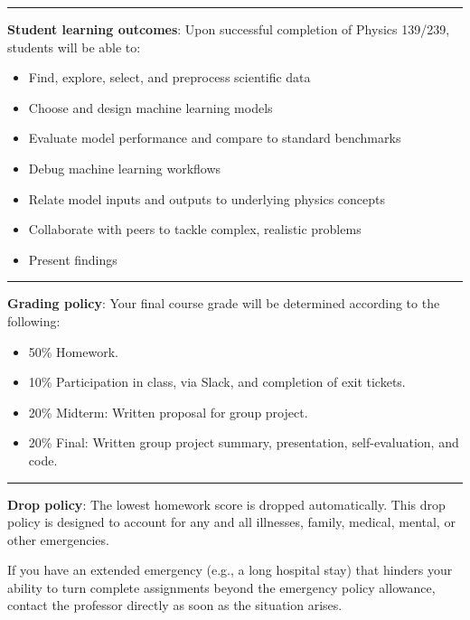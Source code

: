 \documentclass[12pt]{article}
\begin{document}
\begin{center}
	\rule{\textwidth}{0.5pt}
\end{center}

\noindent\textbf{Student learning outcomes}: Upon successful completion of Physics 139/239, students will be able to:
\begin{itemize}
	\item Find, explore, select, and preprocess scientific data
	\item Choose and design machine learning models
	\item Evaluate model performance and compare to standard benchmarks
	\item Debug machine learning workflows
	\item Relate model inputs and outputs to underlying physics concepts
	\item Collaborate with peers to tackle complex, realistic problems
	\item Present findings
\end{itemize}

\begin{center}
	\rule{\textwidth}{0.5pt}
\end{center}

\noindent\textbf{Grading policy}: Your final course grade will be determined according to the following:
\begin{itemize}
	\item 50\% Homework.
	\item 10\% Participation in class, via Slack, and completion of exit tickets.
	\item 20\% Midterm: Written proposal for group project.
	\item 20\% Final: Written group project summary, presentation, self-evaluation, and code.
\end{itemize}

\begin{center}
	\rule{\textwidth}{0.5pt}
\end{center}

\noindent\textbf{Drop policy}: The lowest homework score is dropped automatically.
This drop policy is designed to account for any and all illnesses, family, medical, mental, or other emergencies.

If you have an extended emergency (e.g., a long hospital stay) that hinders your ability to turn complete assignments beyond the emergency policy allowance, contact the professor directly as soon as the situation arises.
\end{document}
